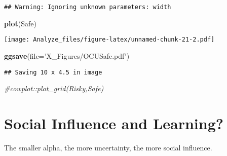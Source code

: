 \documentclass[]{article}
\newenvironment{Shaded}{\begin{snugshade}}{\end{snugshade}}
\newcommand{\KeywordTok}[1]{\textcolor[rgb]{0.13,0.29,0.53}{\textbf{#1}}}
\newcommand{\DataTypeTok}[1]{\textcolor[rgb]{0.13,0.29,0.53}{#1}}
\newcommand{\StringTok}[1]{\textcolor[rgb]{0.31,0.60,0.02}{#1}}
\newcommand{\CommentTok}[1]{\textcolor[rgb]{0.56,0.35,0.01}{\textit{#1}}}
\newcommand{\NormalTok}[1]{#1}
\begin{document}
\begin{verbatim}
## Warning: Ignoring unknown parameters: width
\end{verbatim}

\begin{Shaded}
\begin{Highlighting}[]
  \KeywordTok{plot}\NormalTok{(Safe)}
\end{Highlighting}
\end{Shaded}

\texttt{[image: Analyze\_files/figure-latex/unnamed-chunk-21-2.pdf]}

\begin{Shaded}
\begin{Highlighting}[]
  \KeywordTok{ggsave}\NormalTok{(}\DataTypeTok{file=}\StringTok{'X_Figures/OCUSafe.pdf'}\NormalTok{)}
\end{Highlighting}
\end{Shaded}

\begin{verbatim}
## Saving 10 x 4.5 in image
\end{verbatim}

\begin{Shaded}
\begin{Highlighting}[]
\CommentTok{#cowplot::plot_grid(Risky,Safe)}
\end{Highlighting}
\end{Shaded}

\section{Social Influence and
Learning?}\label{social-influence-and-learning}

The smaller alpha, the more uncertainty, the more social influence.
\end{document}

